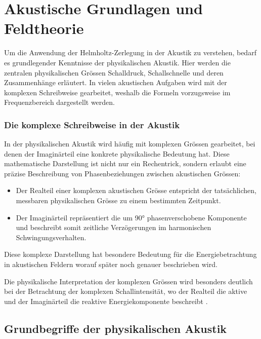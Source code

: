 %
%
%
%
\section{Akustische Grundlagen und Feldtheorie
\label{helmholtz:section:akustische_Grundlagen}}

Um die Anwendung der Helmholtz-Zerlegung in der Akustik zu verstehen, bedarf es grundlegender Kenntnisse der physikalischen Akustik.
Hier werden die zentralen physikalischen Grössen Schalldruck, Schallschnelle und deren Zusammenhänge erläutert.
In vielen akustischen Aufgaben wird mit der komplexen Schreibweise gearbeitet, weshalb die Formeln vorzugsweise im Frequenzbereich dargestellt werden.

\subsubsection{Die komplexe Schreibweise in der Akustik}
%
In der physikalischen Akustik wird häufig mit komplexen Grössen gearbeitet, bei denen der Imaginärteil eine konkrete physikalische Bedeutung hat. Diese mathematische Darstellung ist nicht nur ein Rechentrick, sondern erlaubt eine präzise Beschreibung von Phasenbeziehungen zwischen akustischen Grössen:

\begin{itemize}
\item Der Realteil einer komplexen akustischen Grösse entspricht der tatsächlichen, messbaren physikalischen Grösse zu einem bestimmten Zeitpunkt.

\item Der Imaginärteil repräsentiert die um 90° phasenverschobene Komponente und beschreibt somit zeitliche Verzögerungen im harmonischen Schwingungsverhalten.
\end{itemize}
Diese komplexe Darstellung hat besondere Bedeutung für die Energiebetrachtung in akustischen Feldern worauf später noch genauer beschrieben wird.

Die physikalische Interpretation der komplexen Grössen wird besonders deutlich bei der Betrachtung der komplexen Schallintensität, wo der Realteil die aktive und der Imaginärteil die reaktive Energiekomponente beschreibt \cite{helmholtz:paper}.



\subsection{Grundbegriffe der physikalischen Akustik
\label{helmholtz:subsection:Grundbegriffe_Akustik}}

